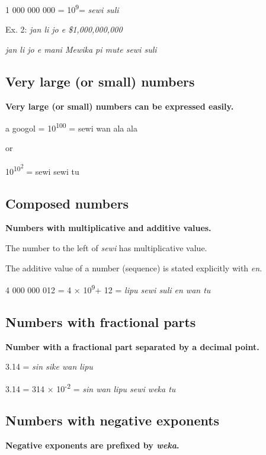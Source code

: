 \documentclass{article}
\begin{document}
	1 000 000 000 = 10\textsuperscript{9}= \emph{sewi suli}
	
\vspace {12 pt}
	
	Ex. 2: \emph{jan li jo e \$1,000,000,000}
	
	\emph{jan li jo e mani Mewika pi mute sewi suli}
	
\subsection{Very large (or small) numbers}

   \textbf{ Very large (or small) numbers can be expressed easily.}
    
    \vspace {6 pt}
	
	a googol = 10\textsuperscript{100} = sewi wan ala ala 
	
	or 
	
	10\textsuperscript{10\textsuperscript{2}} = sewi sewi tu
	
	\subsection{Composed numbers}
	
	\textbf{Numbers with multiplicative and additive values.}
	
	\vspace {6 pt}
	
	The number to the left of \emph{sewi} has multiplicative value.
	
	The additive value of a number (sequence) is stated explicitly with
	\emph{en}.
   \vspace {6 pt}
   	
	4 000 000 012 = 4 × 10\textsuperscript{9}+ 12 = \emph{lipu sewi suli en
		wan tu}
	
	\subsection{Numbers with fractional parts}
	
	\textbf{Number with a fractional part separated by a decimal point.}
	
	3.14 = \emph{sin sike wan lipu}
	
	3.14 = 314 × 10\textsuperscript{-2} = \emph{sin wan lipu sewi weka tu}
	
	\subsection{Numbers with negative exponents}
	
	\textbf{Negative exponents are prefixed by \textit{weka}.}
	
\end{document}
